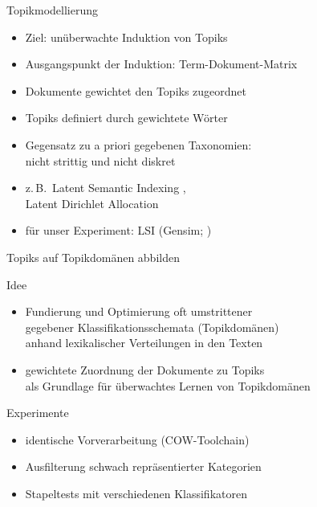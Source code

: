 \documentclass{beamer}
\begin{document}
\begin{frame}
  {Topikmodellierung}
  \begin{itemize}
    \item Ziel: \alert{unüberwachte Induktion von Topiks}
    \item Ausgangspunkt der Induktion: Term-Dokument-Matrix
    \item Dokumente gewichtet den Topiks zugeordnet
    \item Topiks definiert durch gewichtete Wörter
    \item Gegensatz zu a priori gegebenen Taxonomien:\\
      nicht strittig und nicht diskret
      \pause
      \vspace{0.5cm}
    \item z.\,B.\ Latent Semantic Indexing \citep{LandauerDumais1994},\\
      Latent Dirichlet Allocation \citep{BleiEa2003}
      \vspace{0.5cm}
    \item für unser Experiment: LSI (Gensim; \citealp{RehurekSojka2010})
  \end{itemize}
\end{frame}

\begin{frame}
  {Topiks auf Topikdomänen abbilden}
  
  Idee\\
  
  \begin{itemize}
    \item Fundierung und Optimierung oft umstrittener\\
      gegebener Klassifikationsschemata (Topikdomänen)\\
      anhand lexikalischer Verteilungen in den Texten
      \vspace{0.25cm}
    \item gewichtete Zuordnung der Dokumente zu Topiks\\
      als Grundlage für \alert{überwachtes Lernen von Topikdomänen}
  \end{itemize}

  Experimente\\
  
  \begin{itemize}
    \item identische Vorverarbeitung (COW-Toolchain)
    \item Ausfilterung schwach repräsentierter Kategorien
    \item Stapeltests mit verschiedenen Klassifikatoren
  \end{itemize}

\end{frame}
\end{document}
